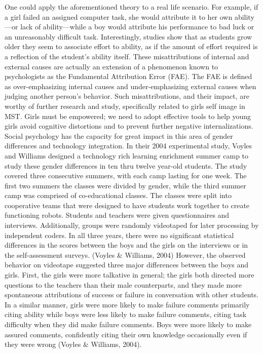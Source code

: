 One could apply the aforementioned theory to a real life scenario. For example, if a girl failed an assigned computer task, she would attribute it to her own ability—or lack of ability—while a boy would attribute his performance to bad luck or an unreasonably difficult task.  Interestingly, studies show that as students grow older they seem to associate effort to ability, as if the amount of effort required is a reflection of the student’s ability itself. These misattributions of internal and external causes are actually an extension of a phenomenon known to psychologists as the Fundamental Attribution Error (FAE).  The FAE is defined as over-emphasizing internal causes and under-emphasizing external causes when judging another person’s behavior. Such misattributions, and their impact, are worthy of further research and study, specifically related to girls self image in MST. Girls must be empowered; we need to adopt effective tools to help young girls avoid cognitive distortions and to prevent further negative internalizations. Social psychology has the capacity for great impact in this area of gender differences and technology integration. 
In their 2004 experimental study, Voyles and Williams designed a technology rich learning enrichment summer camp to study these gender differences in ten thru twelve year-old students.  The study covered three consecutive summers, with each camp lasting for one week.  The first two summers the classes were divided by gender, while the third summer camp was comprised of co-educational classes.  The classes were split into cooperative teams that were designed to have students work together to create functioning robots.  Students and teachers were given questionnaires and interviews.  Additionally, groups were randomly videotaped for later processing by independent coders.  
In all three years, there were no significant statistical differences in the scores between the boys and the girls on the interviews or in the self-assessment surveys. (Voyles \& Williams, 2004)  However, the observed behavior on videotape suggested three major differences between the boys and girls.  First, the girls were more talkative in general; the girls both directed more questions to the teachers than their male counterparts, and they made more spontaneous attributions of success or failure in conversation with other students.  In a similar manner, girls were more likely to make failure comments primarily citing ability while boys were less likely to make failure comments, citing task difficulty when they did make failure comments.  Boys were more likely to make assured comments, confidently citing their own knowledge occasionally even if they were wrong (Voyles \& Williams, 2004).  
